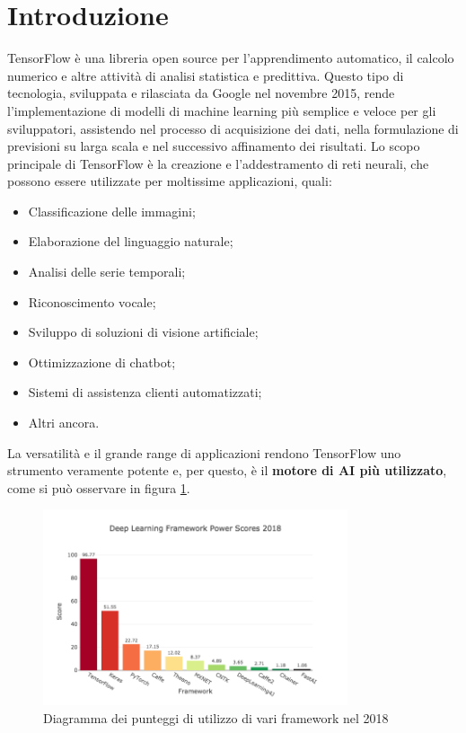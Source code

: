 \section{Introduzione}
TensorFlow è una libreria open source per l'apprendimento automatico, il calcolo numerico e altre attività di analisi statistica e predittiva. Questo
tipo di tecnologia, sviluppata e rilasciata da Google nel novembre 2015, rende l’implementazione di modelli di machine learning più semplice e veloce per
gli sviluppatori, assistendo nel processo di acquisizione dei dati, nella formulazione di previsioni su larga scala e nel successivo affinamento dei risultati.
Lo scopo principale di TensorFlow è la creazione e l’addestramento di reti neurali, che possono essere utilizzate per moltissime applicazioni, quali:
\begin{itemize}
    \item Classificazione delle immagini;
    \item Elaborazione del linguaggio naturale;
    \item Analisi delle serie temporali;
    \item Riconoscimento vocale;
    \item Sviluppo di soluzioni di visione artificiale;
    \item Ottimizzazione di chatbot;
    \item Sistemi di assistenza clienti automatizzati;
    \item Altri ancora.
\end{itemize}

La versatilità e il grande range di applicazioni rendono TensorFlow uno strumento veramente potente e, per questo, è il \textbf{motore di AI più utilizzato},
come si può osservare in figura \ref{fig:diagramma}.

\begin{figure}[ht]
    \centering
    \includegraphics[width=0.8\textwidth]{Immagini/diagramma.png}
    \caption{Diagramma dei punteggi di utilizzo di vari framework nel 2018}
    \label{fig:diagramma}
\end{figure}

